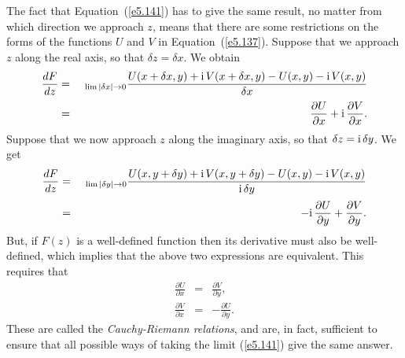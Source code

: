 The fact that Equation~(\ref{e5.141})
 has to give the same result, no matter from which direction we approach
$z$, means that there are some restrictions on the forms of the functions $U$ and $V$ in
 Equation~(\ref{e5.137}).
Suppose that we approach $z$ along the real axis, so that $\delta z = \delta x$.
We obtain
\begin{eqnarray}
\frac{dF}{dz}& =& ~_{\lim |\delta x|\rightarrow 0}
\frac{U(x+\delta x, y) + {\rm i}\, V(x+\delta x, y) - U(x, y) - {\rm i}\,
V(x,y)}{\delta x} 
\nonumber\\[0.5ex]
&=& \frac{\partial U}{\partial x} + {\rm i}\, \frac{\partial V}
{\partial x}.
\end{eqnarray}
Suppose that we now approach $z$ along the imaginary axis, so that $\delta z
= {\rm i}\,\delta y$. We get
\begin{eqnarray}
\frac{dF}{dz} &=& ~_{\lim |\delta y|\rightarrow 0}
\frac{U(x, y+\delta y) + {\rm i}\, V(x, y+\delta y) - U(x, y) - {\rm i}\,
V(x,y)}{{\rm i}\,\delta y}  \nonumber\\[0.5ex]
&=&
-{\rm i}\,\frac{\partial U}{\partial y} + \frac{\partial V}
{\partial y}.
\end{eqnarray}
But, if $F(z)$ is a well-defined function then its derivative must also be 
well-defined,
which implies that the above two expressions are equivalent. This 
requires that
\begin{eqnarray}
\frac{\partial U}{\partial x} &=& \frac{\partial V}{\partial y},\\[0.5ex]
\frac{\partial V}{\partial x} &=& -\frac{\partial U}{\partial y}.
\end{eqnarray}
These are called the {\em Cauchy-Riemann relations}, and are, in fact, sufficient to ensure 
that  all possible ways of taking the limit (\ref{e5.141})  give the same answer.

